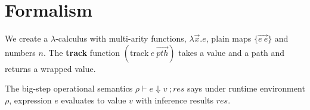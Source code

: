 \chapter{Formalism}

We create a $\lambda$-calculus with multi-arity functions,
$\lambda \overrightarrow{x}. e$,
plain maps
$\{\overrightarrow{e\ e}\}$
and
numbers $n$.
The \textbf{track} function
$(\text{track}\ e\ \overrightarrow{pth})$
takes a value and a path and returns 
a wrapped value.

The big-step operational semantics
$\rho \vdash e \Downarrow v\ ; res$
says under runtime environment $\rho$,
expression $e$ evaluates to value $v$
with inference results $res$.
